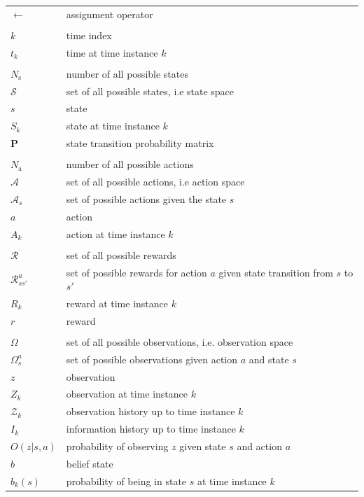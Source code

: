 \documentclass[english, 12pt, a4paper, elec, utf8, a-1b, online]{aaltothesis}
\numberwithin{equation}{section}
\renewcommand{\vec}[1]{\mathbf{#1}}
\newcommand{\Ss}{\mathcal{S}}
\newcommand{\As}{\mathcal{A}}
\newcommand{\Rs}{\mathcal{R}}
\newcommand{\Os}{\Omega}
\newcommand{\Op}{O}
\newcommand{\stprobs}{\vec{P}}
\newcommand{\nacts}{{N_\text{a}}}
\newcommand{\nstates}{{N_\text{s}}}
\begin{document}
\begin{longtable}{ll}
$\leftarrow$ & assignment operator \\
&\\
$k$ & time index \\
$t_k$ & time at time instance $k$ \\
&\\
$\nstates$ & number of all possible states \\
$\Ss$ & set of all possible states, i.e state space \\
$s$ & state \\
$S_k$ & state at time instance $k$ \\
$\stprobs$ & state transition probability matrix \\
&\\
$\nacts$ & number of all possible actions \\
$\As$ & set of all possible actions, i.e action space \\
$\As_s$ & set of possible actions given the state $s$ \\
$a$ & action \\
$A_k$ & action at time instance $k$ \\
&\\
$\Rs$ & set of all possible rewards \\
$\Rs_{ss'}^a$ & set of possible rewards for action $a$ given state transition from $s$ to $s'$ \\
$R_k$ & reward at time instance $k$ \\
$r$ & reward \\
&\\
$\Os$ & set of all possible observations, i.e. observation space \\
$\Os_s^a$ & set of possible observations given action $a$ and state $s$ \\
$z$ & observation \\
$Z_k$ & observation at time instance $k$ \\
$\mathcal{Z}_k$ & observation history up to time instance $k$ \\
$I_k$ & information history up to time instance $k$ \\
$\Op(z | s, a)$ & probability of observing $z$ given state $s$ and action $a$ \\
$b$ & belief state \\
$b_k(s)$ & probability of being in state $s$ at time instance $k$ \\

\end{longtable}
\end{document}
